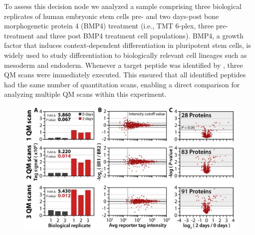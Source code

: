 To assess this decision node we analyzed a sample comprising three biological replicates of human embryonic stem cells pre- and two days-post bone morphogenetic protein 4 (BMP4) treatment (i.e., TMT 6-plex, three pre-treatment and three post BMP4 treatment cell populations). BMP4, a growth factor that induces context-dependent differentiation in pluripotent stem cells, is widely used to study differentiation to biologically relevant cell lineages such as mesoderm and endoderm.\cite{bmp,kdr,nanog} Whenever a target peptide was identified by \inseq{}, three QM scans were immediately executed. This ensured that all identified peptides had the same number of quantitation scans, enabling a direct comparison for analyzing multiple QM scans within this experiment.
\begin{figure}
	\centering
	\includegraphics[width=\columnwidth]{inseq/inSeq_Fig 3.png}
	\label{fig:inseq3}
\end{figure}
